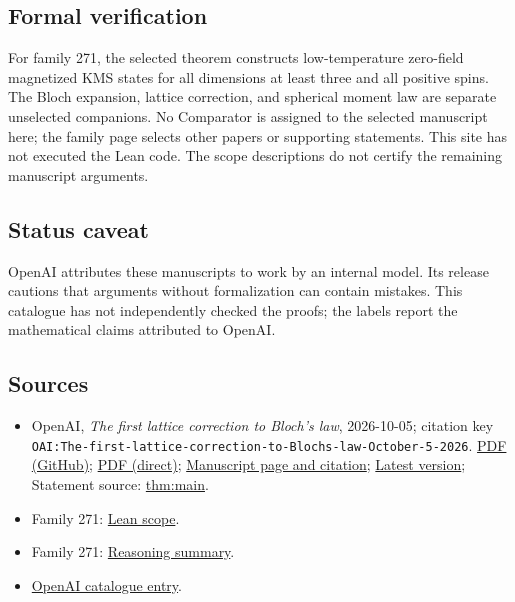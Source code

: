 \documentclass[11pt]{article}
\begin{document}
\subsection{Formal verification}
For family 271, the selected theorem constructs low-temperature zero-field magnetized KMS states for all dimensions at least three and all positive spins. The Bloch expansion, lattice correction, and spherical moment law are separate unselected companions. No Comparator is assigned to the selected manuscript here; the family page selects other papers or supporting statements. This site has not executed the Lean code. The scope descriptions do not certify the remaining manuscript arguments.

\subsection{Status caveat}
OpenAI attributes these manuscripts to work by an internal model. Its release cautions that arguments without formalization can contain mistakes. This catalogue has not independently checked the proofs; the labels report the mathematical claims attributed to OpenAI.

\subsection{Sources}
\begin{itemize}
\item OpenAI, \emph{The first lattice correction to Bloch's law}, 2026-10-05; citation key \texttt{OAI:The-first-lattice-correction-to-Blochs-law-October-5-2026}. \href{https://github.com/openai/math/blob/adc7f1241b42e322a6451854ab7e4b4c146bf78a/preprints/The-first-lattice-correction-to-Blochs-law-October-5-2026/first-lattice-correction-bloch-law.pdf}{PDF (GitHub)}; \href{https://github.com/openai/math/raw/adc7f1241b42e322a6451854ab7e4b4c146bf78a/preprints/The-first-lattice-correction-to-Blochs-law-October-5-2026/first-lattice-correction-bloch-law.pdf}{PDF (direct)}; \href{https://github.com/openai/math/blob/adc7f1241b42e322a6451854ab7e4b4c146bf78a/preprints/The-first-lattice-correction-to-Blochs-law-October-5-2026/README.md}{Manuscript page and citation}; \href{https://github.com/openai/math/blob/main/preprints/The-first-lattice-correction-to-Blochs-law-October-5-2026/first-lattice-correction-bloch-law.pdf}{Latest version}; Statement source: \href{https://github.com/openai/math/blob/adc7f1241b42e322a6451854ab7e4b4c146bf78a/preprints/The-first-lattice-correction-to-Blochs-law-October-5-2026/build/sections/01-introduction.tex\#L45}{thm:main}.
\item Family 271: \href{https://github.com/openai/math/blob/adc7f1241b42e322a6451854ab7e4b4c146bf78a/lean/docs/271.md}{Lean scope}.
\item Family 271: \href{https://github.com/openai/math/blob/adc7f1241b42e322a6451854ab7e4b4c146bf78a/reasoning\_traces/spontaneous-magnetization-quantum-heisenberg-ferromagnet.pdf}{Reasoning summary}.
\item \href{https://github.com/openai/math/blob/adc7f1241b42e322a6451854ab7e4b4c146bf78a/CONTENTS.md}{OpenAI catalogue entry}.
\end{itemize}
\end{document}
